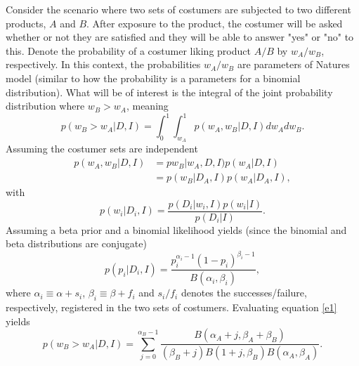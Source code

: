 	\begin{example}
		Consider the scenario where two sets of costumers are subjected to two different products, $A$ and $B$. After exposure to the product, the costumer will be asked whether or not they are satisfied and they will be able to answer "yes" or "no" to this. Denote the probability of a costumer liking product $A/B$ by $w_A/w_B$, respectively. In this context, the probabilities $w_A/w_B$ are parameters of Natures model (similar to how the probability is a parameters for a binomial distribution). What will be of interest is the integral of the joint probability distribution where $w_B>w_A$, meaning
		\begin{equation}
			p(w_B > w_A|D,I)= \int_0^1\int_{w_A}^1p(w_A,w_B|D,I)dw_Adw_B.
			\label{e1}
		\end{equation}
		Assuming the costumer sets are independent
		\begin{equation}
			\begin{split}
				p(w_A,w_B|D,I) &= pw_B|w_A,D,I)p(w_A|D,I)\\
				& = p(w_B|D_A,I)p(w_A|D_A,I),
			\end{split}
		\end{equation}
		with
		\begin{equation}
			p(w_i|D_i,I)=\frac{p(D_i|w_i,I)p(w_i|I)}{p(D_i|I)}.
		\end{equation}
		Assuming a beta prior and a binomial likelihood yields (since the binomial and beta distributions are conjugate)
		\begin{equation}
			p(p_i|D_i,I)=\frac{p_i^{\alpha_i-1}(1-p_i)^{\beta_i-1}}{B(\alpha_i,\beta_i)},
		\end{equation}
		where $\alpha_i\equiv \alpha+s_i$, $\beta_i\equiv \beta+f_i$ and $s_i/f_i$ denotes the successes/failure, respectively, registered in the two sets of costumers. Evaluating equation \eqref{e1} yields
		\begin{equation}
			p(w_B > w_A|D,I)= \sum_{j=0}^{\alpha_B-1}\frac{B(\alpha_A+j,\beta_A+\beta_B)}{(\beta_B+j)B(1+j,\beta_B)B(\alpha_A,\beta_A)}.
		\end{equation}

	\end{example}










